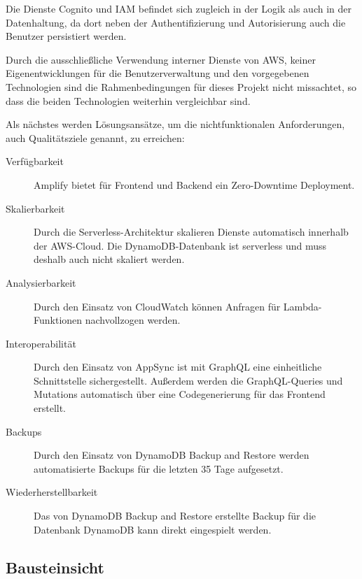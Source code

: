Die Dienste Cognito und IAM befindet sich zugleich in der Logik als auch in der Datenhaltung, da dort neben der Authentifizierung und Autorisierung auch die Benutzer persistiert werden.

Durch die ausschließliche Verwendung interner Dienste von \ac{AWS}, keiner Eigenentwicklungen für die Benutzerverwaltung und den vorgegebenen Technologien sind die Rahmenbedingungen für dieses Projekt nicht missachtet, so dass die beiden Technologien weiterhin vergleichbar sind.

Als nächstes werden Lösungsansätze, um die nichtfunktionalen Anforderungen, auch Qualitätsziele genannt, zu erreichen:

\begin{description}
   \item[Verfügbarkeit] Amplify bietet für Frontend und Backend ein Zero-Downtime Deployment.
   \item[Skalierbarkeit] Durch die Serverless-Architektur skalieren Dienste automatisch innerhalb der \ac{AWS}-Cloud. Die DynamoDB-Datenbank ist serverless und muss deshalb auch nicht skaliert werden.
   \item[Analysierbarkeit] Durch den Einsatz von CloudWatch können Anfragen für Lambda-Funktionen nachvollzogen werden.
   \item[Interoperabilität] Durch den Einsatz von AppSync ist mit GraphQL eine einheitliche Schnittstelle sichergestellt. Außerdem werden die GraphQL-Queries und Mutations automatisch über eine Codegenerierung für das Frontend erstellt.
   \item[Backups] Durch den Einsatz von DynamoDB Backup and Restore werden automatisierte Backups für die letzten 35 Tage aufgesetzt.
   \item[Wiederherstellbarkeit] Das von DynamoDB Backup and Restore erstellte Backup für die Datenbank DynamoDB kann direkt eingespielt werden.
\end{description}

\subsection{Bausteinsicht}

